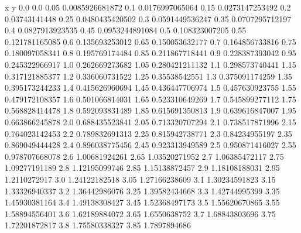               x                y
            0.0              0.0
           0.05  0.0085926681872
            0.1  0.0176997065064
           0.15  0.0273147253492
            0.2    0.03743141448
           0.25  0.0480435420502
            0.3  0.0591449536247
           0.35  0.0707295712197
            0.4  0.0827913923535
           0.45  0.0953244891084
            0.5   0.108323007205
           0.55   0.121781165085
            0.6   0.135693253012
           0.65   0.150053632177
            0.7   0.164856733816
           0.75   0.180097058341
            0.8   0.195769174484
           0.85   0.211867718441
            0.9   0.228387393042
           0.95   0.245322966917
            1.0   0.262669273682
           1.05   0.280421211132
            1.1   0.298573740441
           1.15   0.317121885377
            1.2   0.336060731522
           1.25    0.35538542551
            1.3   0.375091174259
           1.35   0.395173244233
            1.4   0.415626960694
           1.45   0.436447706974
            1.5   0.457630923755
           1.55   0.479172108357
            1.6   0.501066814031
           1.65   0.523310649269
            1.7   0.545899277112
           1.75   0.568828414478
            1.8   0.592093831489
           1.85   0.615691350813
            1.9   0.639616847007
           1.95   0.663866245878
            2.0   0.688435523841
           2.05   0.713320707294
            2.1   0.738517871996
           2.15   0.764023142453
            2.2   0.789832691313
           2.25   0.815942738771
            2.3    0.84234955197
           2.35   0.869049444428
            2.4   0.896038775456
           2.45   0.923313949589
            2.5   0.950871416027
           2.55   0.978707668078
            2.6    1.00681924261
           2.65    1.03520271952
            2.7    1.06385472117
           2.75    1.09277191189
            2.8    1.12195099746
           2.85    1.15138872457
            2.9    1.18108188031
           2.95     1.2110272917
            3.0    1.24122182518
           3.05    1.27166238609
            3.1    1.30234591823
           3.15    1.33326940337
            3.2    1.36442986076
           3.25    1.39582434668
            3.3    1.42744995399
           3.35    1.45930381164
            3.4    1.49138308427
           3.45    1.52368497173
            3.5    1.55620670865
           3.55    1.58894556401
            3.6    1.62189884072
           3.65     1.6550638752
            3.7    1.68843803696
           3.75    1.72201872817
            3.8    1.75580338327
           3.85     1.7897894686
